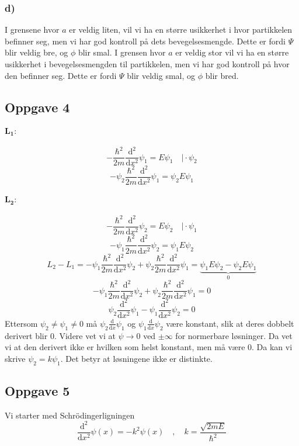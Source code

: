 \documentclass{article}
\begin{document}
\subsubsection*{d)}
I grensene hvor $a$ er veldig liten, vil vi ha en større usikkerhet i hvor partikkelen befinner seg, men vi har god kontroll på dets bevegelsesmengde. Dette er fordi $Ψ$ blir veldig bre, og $ϕ$ blir smal. I grensen hvor $a$ er veldig stor vil vi ha en større usikkerhet i bevegelsesmengden til partikkelen, men vi har god kontroll på hvor den befinner seg. Dette er fordi $Ψ$ blir veldig smal, og $ϕ$ blir bred.

\subsection*{Oppgave 4}
\paragraph*{$\mathbf{L_1}:$}
\[
- \frac{ℏ^2}{2m} \frac{\mathrm{d}^2}{\mathrm{d}x^2} ψ_1 = E ψ_1 \quad \Bigg| ⋅ ψ_2
\]
\[
- ψ_2\frac{ℏ^2}{2m} \frac{\mathrm{d}^2}{\mathrm{d}x^2} ψ_1 = ψ_2E ψ_1
\]
\paragraph*{$\mathbf{L_2}:$}
\[
- \frac{ℏ^2}{2m} \frac{\mathrm{d}^2}{\mathrm{d}x^2} ψ_2 = E ψ_2 \quad \Bigg| ⋅ ψ_1
\]
\[
- ψ_1\frac{ℏ^2}{2m} \frac{\mathrm{d}^2}{\mathrm{d}x^2} ψ_2 = ψ_1E ψ_2
\]
\newline
\[
L_2 - L_1 = - ψ_1\frac{ℏ^2}{2m} \frac{\mathrm{d}^2}{\mathrm{d}x^2} ψ_2 + ψ_2\frac{ℏ^2}{2m} \frac{\mathrm{d}^2}{\mathrm{d}x^2} ψ_1 = \underbrace{ψ_1E ψ_2 - ψ_2E ψ_1}_{0}
\]
\[
- ψ_1\frac{ℏ^2}{2m} \frac{\mathrm{d}^2}{\mathrm{d}x^2} ψ_2   + ψ_2\frac{ℏ^2}{2m} \frac{\mathrm{d}^2}{\mathrm{d}x^2} ψ_1 = 0
\]
\[
ψ_2 \frac{\mathrm{d}^2}{\mathrm{d}x^2} ψ_1 - ψ_1 \frac{\mathrm{d}^2}{\mathrm{d}x^2} ψ_2 = 0
\]
Ettersom $ψ_2 ≠ ψ_1 ≠ 0$ må $\displaystyle ψ_2 \frac{\mathrm{d}}{\mathrm{d}x} ψ_1 $ og $\displaystyle ψ_1 \frac{\mathrm{d}}{\mathrm{d}x} ψ_2 $ være konstant, slik at deres dobbelt derivert blir 0. 
Videre vet vi at $ψ → 0$ ved $\pm∞$ for normerbare løsninger. Da vet vi at den derivert ikke er hvilken som helst konstant, men må være 0. Da kan vi skrive $ψ_2 = kψ_1$. Det betyr at løsningene ikke er distinkte. 

\subsection*{Oppgave 5}
Vi starter med Schrödingerligningen
\[
\frac{\mathrm{d}^2}{\mathrm{d}x^2} ψ(x) = -k^2 ψ(x) \quad , \quad k = \frac{\sqrt{2mE}}{ℏ^2}
\]
\end{document}
